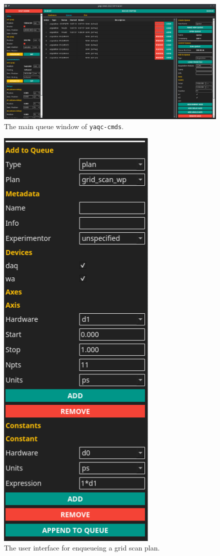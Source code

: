 \documentclass[11pt, full]{article}
\newcommand\yaqccmds{\texttt{yaqc-cmds}}
\begin{document}
\clearpage

\begin{landscape}
\begin{figure}
\includegraphics[width=9in]{"figures/yaqc-cmds.png"}
\caption{The main queue window of \yaqccmds{}.}
\label{acq:fig:yaqccmds}
\end{figure}
\end{landscape}

\clearpage

\begin{figure}
\includegraphics[width=3in]{"figures/grid_scan.png"}
\caption{The user interface for enqueueing a grid scan plan.}
\label{acq:fig:grid_scan}
\end{figure}
\end{document}
